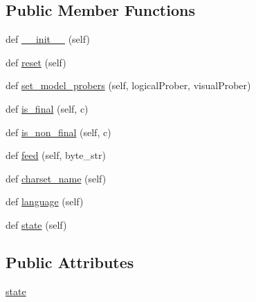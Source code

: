 \subsection*{Public Member Functions}
\begin{DoxyCompactItemize}
\item 
def \hyperlink{classpip_1_1__vendor_1_1chardet_1_1hebrewprober_1_1HebrewProber_a17a019e7728fc0c21aeba2cd87acb16f}{\+\_\+\+\_\+init\+\_\+\+\_\+} (self)
\item 
def \hyperlink{classpip_1_1__vendor_1_1chardet_1_1hebrewprober_1_1HebrewProber_a255f4e84d025fcd0ccf75e9b303f5317}{reset} (self)
\item 
def \hyperlink{classpip_1_1__vendor_1_1chardet_1_1hebrewprober_1_1HebrewProber_a848e27f96c548d440a2bc45ef0632718}{set\+\_\+model\+\_\+probers} (self, logical\+Prober, visual\+Prober)
\item 
def \hyperlink{classpip_1_1__vendor_1_1chardet_1_1hebrewprober_1_1HebrewProber_aa98a5ab888aa94716e0103a8db3297c8}{is\+\_\+final} (self, c)
\item 
def \hyperlink{classpip_1_1__vendor_1_1chardet_1_1hebrewprober_1_1HebrewProber_a52eb4f35aab945530aab6d212d2c9124}{is\+\_\+non\+\_\+final} (self, c)
\item 
def \hyperlink{classpip_1_1__vendor_1_1chardet_1_1hebrewprober_1_1HebrewProber_aa1fce7290d1b2c5f7782beaf4bde6198}{feed} (self, byte\+\_\+str)
\item 
def \hyperlink{classpip_1_1__vendor_1_1chardet_1_1hebrewprober_1_1HebrewProber_a60278a699386fb042b9c2b8db1b4cf18}{charset\+\_\+name} (self)
\item 
def \hyperlink{classpip_1_1__vendor_1_1chardet_1_1hebrewprober_1_1HebrewProber_a0ebc7c3d6a351f58682178da11ec421c}{language} (self)
\item 
def \hyperlink{classpip_1_1__vendor_1_1chardet_1_1hebrewprober_1_1HebrewProber_aeaf79c9254fc3aa09fa7c0b657e16c77}{state} (self)
\end{DoxyCompactItemize}
\subsection*{Public Attributes}
\begin{DoxyCompactItemize}
\item 
\hyperlink{classpip_1_1__vendor_1_1chardet_1_1hebrewprober_1_1HebrewProber_a768ea8f05beb97cd6e5447beb303486d}{state}
\end{DoxyCompactItemize}

